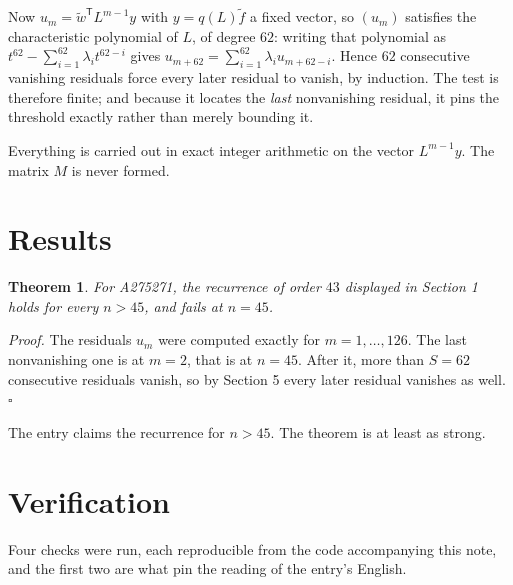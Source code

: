 \documentclass[11pt]{article}
\newtheorem{theorem}{Theorem}
\theoremstyle{definition}
\begin{document}
Now $u_m = \tilde w^{\mathsf T} L^{m-1} y$ with $y = q(L)\tilde f$ a fixed vector, so $(u_m)$ satisfies the characteristic polynomial of $L$, of degree $62$: writing that polynomial as $t^{62} - \sum_{i=1}^{62} \lambda_i t^{62-i}$ gives $u_{m+62} = \sum_{i=1}^{62} \lambda_i u_{m+62-i}$. Hence $62$ consecutive vanishing residuals force every later residual to vanish, by induction. The test is therefore finite; and because it locates the {\itshape last} nonvanishing residual, it pins the threshold exactly rather than merely bounding it.

Everything is carried out in exact integer arithmetic on the vector $L^{m-1}y$. The matrix $M$ is never formed.

\section{Results}

\begin{theorem} For A275271, the recurrence of order $43$ displayed in Section 1 holds for every $n > 45$, and fails at $n = 45$.\end{theorem}

{\itshape Proof.} The residuals $u_m$ were computed exactly for $m = 1,\dots,126$. The last nonvanishing one is at $m = 2$, that is at $n = 45$. After it, more than $S = 62$ consecutive residuals vanish, so by Section 5 every later residual vanishes as well. $\square$

The entry claims the recurrence for $n > 45$. The theorem is at least as strong.

\section{Verification}

Four checks were run, each reproducible from the code accompanying this note, and the first two are what pin the reading of the entry's English.
\end{document}

